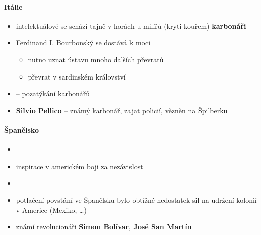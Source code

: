 \paragraph{Itálie}
\begin{itemize}
\item intelektuálové se schází tajně v horách u milířů (kryti kouřem) \ra \textbf{karbonáři}
\item {} \ra Ferdinand I. Bourbonský se dostává k moci
	\begin{itemize}
	\item nutno uznat ústavu \ra mnoho dalších převratů
	\item převrat v sardinském království
	\end{itemize}
\item {} -- pozatýkání karbonářů
\item \textbf{Silvio Pellico} -- známý karbonář, zajat policií, vězněn na Špilberku
\end{itemize}

\paragraph{Španělsko}
\begin{itemize}
\item {}
\item inspirace v americkém boji za nezávislost
\item {}
\item potlačení povstání ve Španělsku bylo obtížné \ra nedostatek sil na udržení kolonií v Americe (Mexiko, \ldots)
\item známí revolucionáři \textbf{Simon Bolívar}, \textbf{José San Martín}
\end{itemize}

